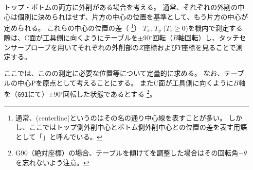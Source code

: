 

トップ・ボトムの両方に外削がある場合を考える。
通常、それぞれの外削の中心は個別に決められはせず、片方の中心の位置を基準として、もう片方の中心が定められる。
これらの中心の位置の差（\textbf{\CenterlineEndFaceDif}
\footnote{通常、\CenterlineEndFaceDif(centerline)というのはその名の通り中心線を表すことが多い。
しかし、ここではトップ側外削中心とボトム側外削中心との位置の差を表す用語として「\CenterlineEndFaceDif」と呼んでいる。}）
$T_x$, $T_y$ ($T_x \geq 0$)を機内で測定する際は、C面が工具側に向くようにテーブルを$\pm$90$^\circ$回転（$B$軸回転）し、タッチセンサープローブを用いてそれぞれの外削部の$Z$座標および$Y$座標を見ることで測定する。

ここでは、この\nameCenterlineEndFaceDif の測定に必要な位置等について定量的に求める。
なお、テーブルの中心Pを原点として考えることにする。
またC面が工具側に向くように$B$軸を（\verb|G91|にて）$\pm$90$^\circ$回転した状態であるとする
\footnote{{\ttfamily G90}（絶対座標）の場合、テーブルを傾けて\AlocationLength を調整した場合はその回転角$-\theta$を忘れないよう注意。}。



